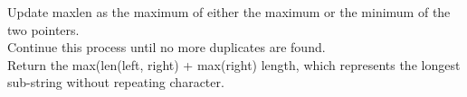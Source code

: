 \documentclass[preview]{standalone}
\begin{document}
Update maxlen as the maximum of either the maximum or the minimum of the two pointers.\\Continue this process until no more duplicates are found.\\Return the max(len(left, right) + max(right) length, which represents the longest sub-string without repeating character.\\
\end{document}
